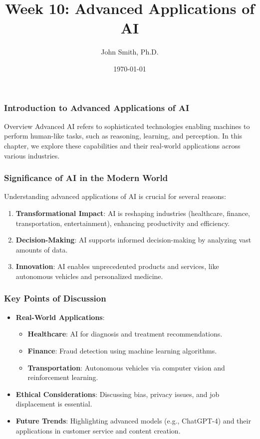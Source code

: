 \documentclass[aspectratio=169]{beamer}
\title[Advanced AI Applications]{Week 10: Advanced Applications of AI}
\author[J. Smith]{John Smith, Ph.D.}
\institute[University Name]{
  Department of Computer Science\\
  University Name\\
  \vspace{0.3cm}
  Email: email@university.edu\\
  Website: www.university.edu
}
\date{\today}
\begin{document}
\frame{\titlepage}

\begin{frame}[fragile]
    \frametitle{Introduction to Advanced Applications of AI}
    \begin{block}{Overview}
        Advanced AI refers to sophisticated technologies enabling machines to perform human-like tasks, such as reasoning, learning, and perception. In this chapter, we explore these capabilities and their real-world applications across various industries.
    \end{block}
\end{frame}

\begin{frame}[fragile]
    \frametitle{Significance of AI in the Modern World}
    Understanding advanced applications of AI is crucial for several reasons:
    \begin{enumerate}
        \item \textbf{Transformational Impact}: AI is reshaping industries (healthcare, finance, transportation, entertainment), enhancing productivity and efficiency.
        \item \textbf{Decision-Making}: AI supports informed decision-making by analyzing vast amounts of data.
        \item \textbf{Innovation}: AI enables unprecedented products and services, like autonomous vehicles and personalized medicine.
    \end{enumerate}
\end{frame}

\begin{frame}[fragile]
    \frametitle{Key Points of Discussion}
    \begin{itemize}
        \item \textbf{Real-World Applications}:
            \begin{itemize}
                \item \textbf{Healthcare}: AI for diagnosis and treatment recommendations.
                \item \textbf{Finance}: Fraud detection using machine learning algorithms.
                \item \textbf{Transportation}: Autonomous vehicles via computer vision and reinforcement learning.
            \end{itemize}
        
        \item \textbf{Ethical Considerations}: Discussing bias, privacy issues, and job displacement is essential.
        
        \item \textbf{Future Trends}: Highlighting advanced models (e.g., ChatGPT-4) and their applications in customer service and content creation.
    \end{itemize}
\end{frame}
\end{document}
